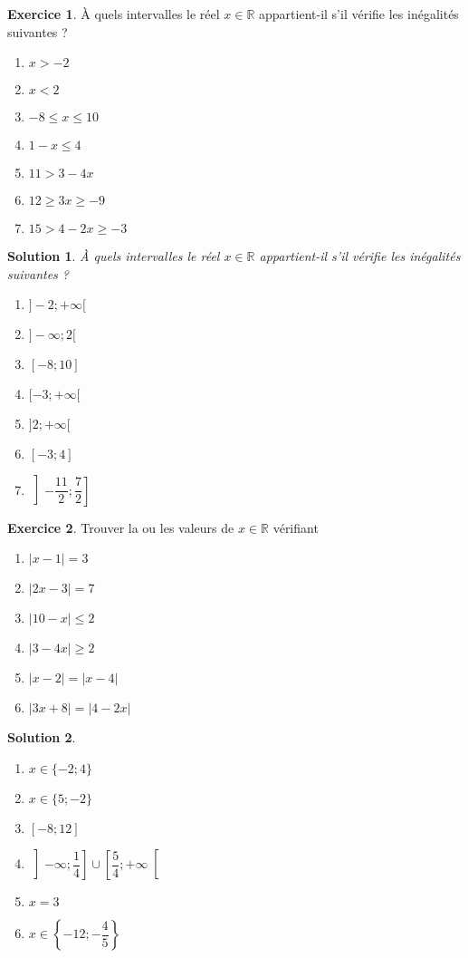 \documentclass[a4paper, 14pt]{extarticle}
\theoremstyle{plain}
\newtheorem*{sol}{Solution}
\theoremstyle{definition}
\newtheorem{ex}{Exercice}
\newcommand{\R}{\mathbb{R}}
\newcommand{\exe}[2]{
		\begin{ex} #1  \end{ex}
		\begin{sol} #2 \end{sol}
	}
\newcommand{\exe}[2]{
		\begin{ex} #1  \end{ex}
	}
\begin{document}
\exe{
	À quels intervalles le réel $x \in \R$ appartient-il s'il vérifie les inégalités suivantes ?
	\begin{multicols}{2}
	\begin{enumerate}
		\item $x > -2$
		\item $x  < 2$
		\item $-8 \leq x \leq 10$
		\item $1 - x \leq 4$
		\item $ 11 > 3 - 4x  $
		\item $12 \geq 3x \geq -9$
		\item $15 > 4 - 2x \geq -3$
	\end{enumerate}
	\end{multicols}
}
{


	À quels intervalles le réel $x \in \R$ appartient-il s'il vérifie les inégalités suivantes ?
	\begin{multicols}{2}
	\begin{enumerate}
		\item $]{-}2; {+}\infty[$
		\item $]{-}\infty ; 2[$
		\item $[-{8}; 10]$
		\item $[-3 ; {+}\infty[$
		\item $]2 ; {+}\infty[$
		\item $[-3 ; 4]$
		\item $\left] -\dfrac{11}2 ; \dfrac72 \right]$
	\end{enumerate}
	\end{multicols}

}


\exe{
	Trouver la ou les valeurs de $x \in \R$ vérifiant
	\begin{multicols}{2}
	\begin{enumerate}
		\item $|x - 1| = 3$
		\item $|2x-3| = 7$
		\item $|10-x| \leq 2$
		\item $|3 - 4x| \geq 2$
		\item $|x-2| = |x-4|$
		\item $| 3x + 8| = |4 - 2x |$
	\end{enumerate}
	\end{multicols}
}
{


	\begin{multicols}{2}
	\begin{enumerate}
		\item $x \in \{-2 ; 4\}$
		\item $x \in \{5 ; -2\}$
		\item $[{-}8 ; 12]$
		\item $\left]{-}\infty ; \dfrac14\right] \cup \left[\dfrac54; {+}\infty\right[$
		\item $x = 3$
		\item $x \in \left\{-12 ; -\dfrac45\right\}$
	\end{enumerate}
	\end{multicols}


}
\end{document}
